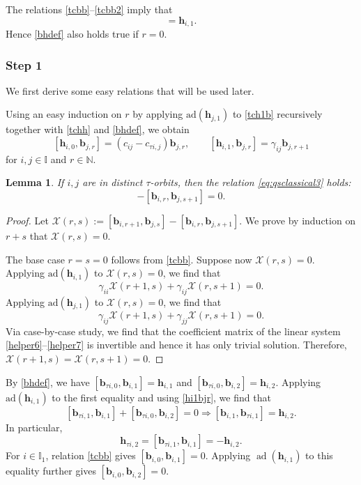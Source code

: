 \documentclass[11pt,reqno]{amsart}
\numberwithin{equation}{section}
\newtheorem{lem}[thm]{Lemma}
\theoremstyle{definition}
\theoremstyle{remark}
\newcommand{\beq}{\begin{equation}}
\newcommand{\eeq}{\end{equation}}
\newcommand{\be}{\begin{equation*}}
\newcommand{\ee}{\end{equation*}}
\newcommand{\bN}{\mathbb{N}}
\newcommand{\bb}{\mathbf{b}}
\newcommand{\bh}{\mathbf{h}}
\newcommand{\I}{{\mathbb I}}
\begin{document}
The relations \eqref{tcbb}--\eqref{tcbb2} imply that 
\be
[\bb_{\tau i,0},\bb_{i,1}]=\bh_{i,1}.
\ee
Hence \eqref{bhdef} also holds true if $r=0$.

\subsubsection*{\bf Step 1} We first derive some easy relations that will be used later.

Using an easy induction on $r$ by applying $\mathrm{ad}(\bh_{j,1})$ to \eqref{tch1b} recursively together with \eqref{tchh} and \eqref{bhdef}, we obtain
\beq\label{hi1bjr}[\bh_{i,0},\bb_{j,r}]=(c_{ij}-c_{\tau i,j})\bb_{j,r},\qquad [\bh_{i,1},\bb_{j,r}]=\gamma_{ij}\bb_{j,r+1} 
\eeq
for $i,j\in \I$ and $r\in\bN$.

\begin{lem}\label{lem:bb}
If $i,j$ are in distinct $\tau$-orbits, then the relation \eqref{eq:qsclassical3} holds:
\be
[\bb_{i,r+1},\bb_{j,s}]-[\bb_{i,r},\bb_{j,s+1}]=0.
\ee
\end{lem}
\begin{proof}
Let $\mathcal X(r,s):=[\bb_{i,r+1},\bb_{j,s}]-[\bb_{i,r},\bb_{j,s+1}]$. We prove by induction on $r+s$ that  $\mathcal X(r,s)=0$. 

The base case $r=s=0$ follows from \eqref{tcbb}. Suppose now $\mathcal X(r,s)=0$. Applying $\mathrm{ad}(\bh_{i,1})$ to $\mathcal X(r,s)=0$, we find that 
\beq\label{helper6}
\gamma_{ii}\mathcal X(r+1,s)+\gamma_{ij}\mathcal X(r,s+1)=0.
\eeq
Applying $\mathrm{ad}(\bh_{j,1})$ to $\mathcal X(r,s)=0$, we find that 
\beq\label{helper7}
\gamma_{ij}\mathcal X(r+1,s)+\gamma_{jj}\mathcal X(r,s+1)=0.
\eeq
Via case-by-case study, we find that the coefficient matrix of the linear system \eqref{helper6}--\eqref{helper7} is invertible and hence it has only trivial solution. Therefore, $\mathcal X(r+1,s)=\mathcal X(r,s+1)=0$.
\end{proof}

By \eqref{bhdef}, we have $[\bb_{\tau i,0},\bb_{i,1}]=\bh_{i,1}$ and $[\bb_{\tau i,0},\bb_{i,2}]=\bh_{i,2}$. Applying $\mathrm{ad}(\bh_{i,1})$ to the first equality and using \eqref{hi1bjr}, we find that
\beq\label{eq:fork-h2-bracket}
[\bb_{\tau i,1},\bb_{i,1}]+[\bb_{\tau i,0},\bb_{i,2}]=0\Longrightarrow [\bb_{i,1},\bb_{\tau i,1}]=\bh_{i,2}.
\eeq
In particular, 
\beq\label{eq:h2i-taui}
\bh_{\tau i,2}=[\bb_{\tau i,1},\bb_{i,1}]=-\bh_{i,2}.
\eeq
For $i\in\I_1$, relation \eqref{tcbb} gives
$[\bb_{i,0},\bb_{i,1}]=0$. Applying $\operatorname{ad}(\bh_{i,1})$
to this equality further gives $[\bb_{i,0},\bb_{i,2}]=0$.
\end{document}
